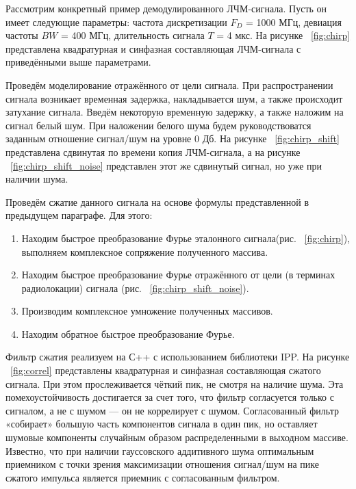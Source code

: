 Рассмотрим конкретный пример демодулированного ЛЧМ-сигнала. Пусть он имеет следующие параметры: частота дискретизации \(F_{D}\) = 1000 МГц, девиация частоты \(BW\) = 400 МГц, длительность сигнала \(T\) = 4 мкс. На рисунке ~\ref{fig:chirp} представлена квадратурная и синфазная составляющая ЛЧМ-сигнала с приведёнными выше параметрами. 

Проведём моделирование отражённого от цели сигнала. При распространении сигнала возникает временная задержка, накладывается шум, а также происходит затухание сигнала. Введём некоторую временную задержку, а также наложим на сигнал белый шум. При наложении белого шума будем руководствоватся заданным отношение сигнал/шум на уровне 0 Дб. На рисунке ~\ref{fig:chirp_shift} представлена сдвинутая по времени копия ЛЧМ-сигнала, а на рисунке ~\ref{fig:chirp_shift_noise} представлен этот же сдвинутый сигнал, но уже при наличии шума.  

Проведём сжатие данного сигнала на основе формулы представленной в предыдущем параграфе. Для этого:

\begin{enumerate}
	\item Находим быстрое преобразование Фурье эталонного сигнала(рис. ~\ref{fig:chirp}), выполняем комплексное сопряжение полученного массива.
	\item Находим быстрое преобразование Фурье отражённого от цели (в терминах радиолокации) сигнала (рис. ~\ref{fig:chirp_shift_noise}).
	\item Производим комплексное умножение полученных массивов.
	\item Находим обратное быстрое преобразование Фурье.
\end{enumerate}

Фильтр сжатия реализуем на С++ с использованием библиотеки IPP. На рисунке ~\ref{fig:correl} представлены квадратурная и синфазная составляющая сжатого сигнала. При этом прослеживается чёткий пик, не смотря на наличие шума. Эта помехоустойчивость достигается за счет того, что фильтр согласуется только с сигналом, а не с шумом — он не коррелирует с шумом. Согласованный фильтр «собирает» большую часть компонентов сигнала в один пик, но оставляет шумовые компоненты случайным образом распределенными в выходном массиве. Известно, что при наличии гауссовского аддитивного шума оптимальным приемником с точки зрения максимизации отношения сигнал/шум на пике сжатого импульса является приемник с согласованным фильтром.

